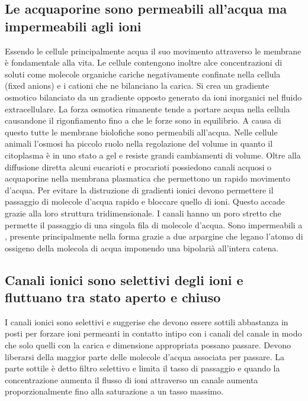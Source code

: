 \subsection{Le acquaporine sono permeabili all'acqua ma impermeabili agli ioni}
Essendo le cellule principalmente acqua il suo movimento attraverso le membrane \`e fondamentale alla vita. Le cellule contengono inoltre alce concentrazioni di soluti come molecole
organiche cariche negativamente confinate nella cellula (fixed anions) e i cationi che ne bilanciano la carica. Si crea un gradiente osmotico bilanciato da un gradiente opposto generato
da ioni inorganici nel fluido extracellulare. La forza osmotica rimanente tende a portare acqua nella cellula causandone il rigonfiamento fino a che le forze sono in equilibrio. A 
causa di questo tutte le membrane biolofiche sono permeabili all'acqua. Nelle cellule animali l'osmosi ha piccolo ruolo nella regolazione del volume in quanto il citoplasma \`e in uno
stato a gel e resiste grandi cambiamenti di volume. Oltre alla diffusione diretta alcuni eucarioti e procarioti possiedono canali acquosi o acquaporine nella membrana plasmatica che
permettono un rapido movimento d'acqua. Per evitare la distruzione di gradienti ionici devono permettere il passaggio di molecole d'acqua rapido e bloccare quello di ioni. Questo accade
grazie alla loro struttura tridimensionale. I canali hanno un poro stretto che permette il passaggio di una singola fila di molecole d'acqua. Sono impermeabili a , presente 
principalmente nella forma  grazie a due arpargine che legano l'atomo di ossigeno della molecola di acqua imponendo una bipolari\`a all'intera catena. 
\subsection{Canali ionici sono selettivi degli ioni e fluttuano tra stato aperto e chiuso}
I canali ionici sono selettivi e suggerise che devono essere sottili abbastanza in posti per forzare ioni permeanti in contatto intipo con i canali del canale in modo che solo quelli
con la carica e dimensione appropriata possano passare. Devono liberarsi della maggior parte delle molecole d'acqua associata per passare. La parte sottile \`e detto filtro selettivo
e limita il tasso di passaggio e quando la concentrazione aumenta il flusso di ioni attraverso un canale aumenta proporzionalmente fino alla saturazione a un tasso massimo.

